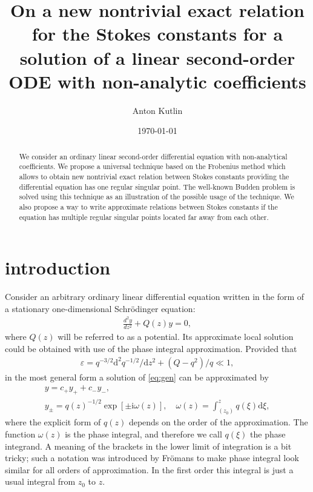 \documentclass[aip,jmp,reprint]{revtex4-1}
\def\rmi{\mathrm{i}}
\def\rmd{\mathrm{d}}
\def\w{\omega}
\newcommand\phsintgrnd[1][z]{q(#1)}
\newcommand\predexp[1][z]{q(#1)^{-1/2}}
\newcommand\phsintgrl[3][z]{\int_{#2}^{#3} \phsintgrnd[#1] \rmd #1}
\begin{document}
\title{On a new nontrivial exact relation for the Stokes constants for a solution of 
a linear second-order ODE with non-analytic coefficients}
\author{Anton Kutlin}

\date{\today}

\begin{abstract}
We consider an ordinary linear second-order differential equation with non-analytical coefficients.
We propose a universal technique based on the Frobenius method which allows to obtain new nontrivial 
exact relation between Stokes constants providing the differential equation has one regular singular point.
The well-known Budden problem is solved using this technique as an illustration of the possible usage
of the technique. We also propose a way to write approximate relations between Stokes constants 
if the equation has multiple regular singular points located far away from each other.
\end{abstract}


\maketitle

\section{introduction \label{sec:intro}}
Consider an arbitrary ordinary linear differential equation written in the form of 
a stationary one-dimensional Schr\"odinger equation:
\begin{eqnarray}
\frac{d^2y}{dz^2} + Q(z)y = 0,   \label{eq:gen}
\end{eqnarray}
where $Q(z)$ will be referred to as a potential. Its approximate local solution could be obtained
with use of the phase integral approximation. Provided that 
\begin{eqnarray}
\varepsilon = q^{-3/2} \rmd^2 q^{-1/2}/\rmd z^2  + (Q - q^2)/q \ll 1,   \label{eq:cond}
\end{eqnarray}
in the most general form a solution of \eqref{eq:gen} can be approximated by
\begin{eqnarray}
y = c_+y_+ + c_-y_-, \\ \label{eq:gensol}
y_\pm = \predexp \exp [\pm \rmi \w(z)], \quad \w(z)=\phsintgrl[\xi]{(z_0)}{z},   \label{eq:phsint}
\end{eqnarray}
where the explicit form of $q(z)$ depends on the order of the approximation.
The function $\w(z)$ is the phase integral, and therefore we call $\phsintgrnd[\xi]$ 
the phase integrand. A meaning of the brackets in the lower limit of integration is a 
bit tricky; such a notation was introduced by Fr\"omans \cite{frpaper} to make
phase integral look similar for all orders of approximation. In the first order this integral 
is just a usual integral from $z_0$ to $z$. 
\end{document}
